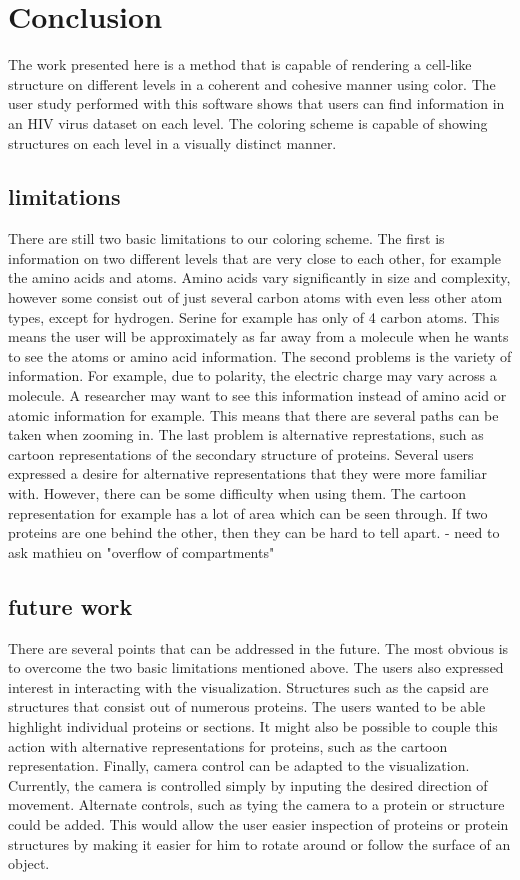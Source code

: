 \documentclass[review,journal]{vgtc}         %
\begin{document}
\section{Conclusion}
The work presented here is a method that is capable of rendering a cell-like structure on different levels in a coherent and cohesive manner using color. 
The user study performed with this software shows that users can find information in an HIV virus dataset on each level. 
The coloring scheme is capable of showing structures on each level in a visually distinct manner.



\subsection{limitations}
There are still two basic limitations to our coloring scheme. 
The first is information on two different levels that are very close to each other, for example the amino acids and atoms. 
Amino acids vary significantly in size and complexity, however some consist out of just several carbon atoms with even less other atom types, except for hydrogen. 
Serine for example has only of 4 carbon atoms. This means the user will be approximately as far away from a molecule when he wants to see the atoms or amino acid information. 
The second problems is the variety of information. For example, due to polarity, the electric charge may vary across a molecule. 
A researcher may want to see this information instead of amino acid or atomic information for example.
This means that there are several paths can be taken when zooming in.
The last problem is alternative represtations, such as cartoon representations of the secondary structure of proteins. 
Several users expressed a desire for alternative representations that they were more familiar with. 
However, there can be some difficulty when using them. The cartoon representation for example has a lot of area which can be seen through. 
If two proteins are one behind the other, then they can be hard to tell apart.
- need to ask mathieu on "overflow of compartments"


\subsection{future work}
There are several points that can be addressed in the future. The most obvious is to overcome the two basic limitations mentioned above. 
The users also expressed interest in interacting with the visualization. 
Structures such as the capsid are structures that consist out of numerous proteins. 
The users wanted to be able highlight individual proteins or sections. 
It might also be possible to couple this action with alternative representations for proteins, such as the cartoon representation.
Finally, camera control can be adapted to the visualization. 
Currently, the camera is controlled simply by inputing the desired direction of movement. 
Alternate controls, such as tying the camera to a protein or structure could be added.
This would allow the user easier inspection of proteins or protein structures by making it easier for him to rotate around or follow the surface of an object.
\end{document}
